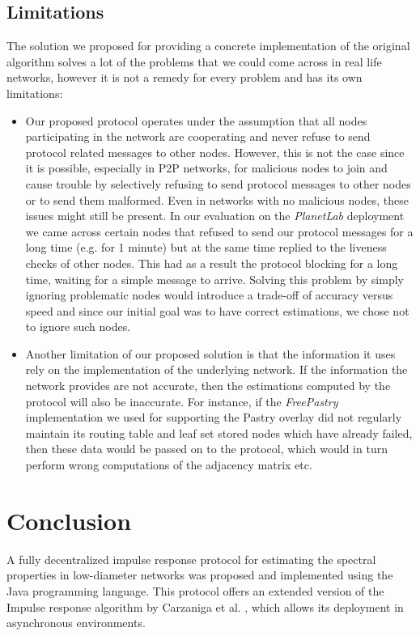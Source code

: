 \documentclass[a4paper,11pt,twoside]{report}
\begin{document}
\section{Limitations}

The solution we proposed for providing a concrete implementation of the original algorithm solves a lot of the problems that we could come across in real life networks, however it is not a remedy for every problem and has its own limitations:

\begin{itemize}
\item Our proposed protocol operates under the assumption that all nodes participating in the network are cooperating and never refuse to send protocol related messages to other nodes. However, this is not the case since it is possible, especially in P2P networks, for malicious nodes to join and cause trouble by selectively refusing to send protocol messages to other nodes or to send them malformed. Even in networks with no malicious nodes, these issues might still be present. In our evaluation on the \textit{PlanetLab} deployment we came across certain nodes that refused to send our protocol messages for a long time (e.g. for 1 minute) but at the same time replied to the liveness checks of other nodes. This had as a result the protocol blocking for a long time, waiting for a simple message to arrive. Solving this problem by simply ignoring problematic nodes would introduce a trade-off of accuracy versus speed and since our initial goal was to have correct estimations, we chose not to ignore such nodes.
\item Another limitation of our proposed solution is that the information it uses rely on the implementation of the underlying network. If the information the network provides are not accurate, then the estimations computed by the protocol will also be inaccurate. For instance, if the \textit{FreePastry} implementation we used for supporting the Pastry overlay did not regularly maintain its routing table and leaf set stored nodes which have already failed, then these data would be passed on to the protocol, which would in turn perform wrong computations of the adjacency matrix etc.
\end{itemize} 


\chapter{Conclusion}
\label{sec:conclusion}

A fully decentralized impulse response protocol for estimating the spectral properties in low-diameter networks was proposed and implemented using the Java programming language. This protocol offers an extended version of the Impulse response algorithm by Carzaniga et al. \cite{6195806}, which allows its deployment in asynchronous environments.\\
\end{document}
